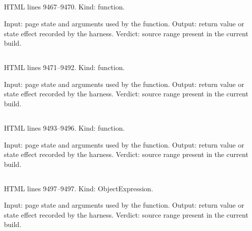 \subsection*{\texttt{}}
\label{vf_517_hashColour}
HTML lines 9467--9470. Kind: function.

Input: page state and arguments used by the function.
Output: return value or state effect recorded by the harness.
Verdict: source range present in the current build.

\subsection*{\texttt{}}
\label{vf_518_reviewBundleEntries}
HTML lines 9471--9492. Kind: function.

Input: page state and arguments used by the function.
Output: return value or state effect recorded by the harness.
Verdict: source range present in the current build.

\subsection*{\texttt{}}
\label{vf_519_downloadReviewBundle}
HTML lines 9493--9496. Kind: function.

Input: page state and arguments used by the function.
Output: return value or state effect recorded by the harness.
Verdict: source range present in the current build.

\subsection*{\texttt{}}
\label{vf_520_FINDING_SEVERITY_RANK}
HTML lines 9497--9497. Kind: ObjectExpression.

Input: page state and arguments used by the function.
Output: return value or state effect recorded by the harness.
Verdict: source range present in the current build.

